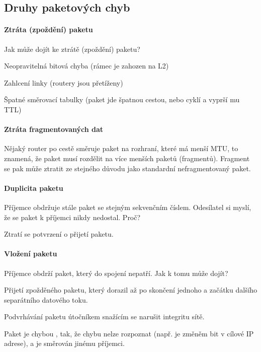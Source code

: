 \subsection{Druhy paketových chyb}

\paragraph*{Ztráta (zpoždění) paketu} Jak může dojít ke ztrátě (zpoždění) paketu? \begin{compactitem}
    \item Neopravitelná bitová chyba (rámec je zahozen na L2)
    \item Zahlcení linky (routery jsou přetíženy)
    \item Špatné směrovací tabulky (paket jde špatnou cestou, nebo cyklí a vyprší mu TTL)
\end{compactitem}

\paragraph*{Ztráta fragmentovaných dat} Nějaký router po cestě směruje paket na rozhraní, které má menší MTU, to znamená, že paket musí rozdělit na více menších paketů (fragmentů). Fragment se pak může ztratit ze stejného důvodu jako standardní nefragmentovaný paket.

\paragraph*{Duplicita paketu} Příjemce obdržuje stále paket se stejným sekvenčním číslem. Odesílatel si myslí, že se paket k příjemci nikdy nedostal. Proč? \begin{compactitem}
    \item Ztratí se potvrzení o přijetí paketu.
\end{compactitem}

\paragraph*{Vložení paketu} Příjemce obdrží paket, který do spojení nepatří. Jak k tomu může dojít? \begin{compactitem}
    \item Přijetí zpožděného paketu, který dorazil až po skončení jednoho a začátku dalšího separátního datového toku.
    \item Podvrhávání paketu útočníkem snažícím se narušit integritu sítě.
    \item Paket je chybou , tak, že chybu nelze rozpoznat (např. je změněm bit v cílové IP adrese), a je směrován jinému příjemci.
\end{compactitem}

